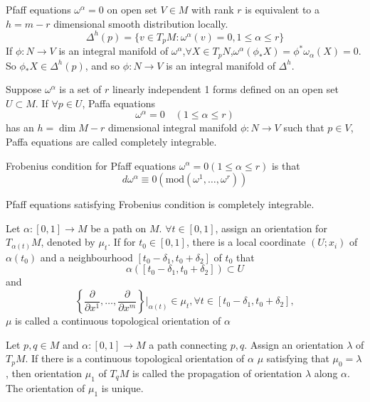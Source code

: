 \begin{newprop}
Pfaff equations $\omega^{\alpha} = 0$ on open set $V \in M$ with rank $r$ is equivalent to a $h=m-r$ dimensional smooth distribution locally.
\[\Delta^h(p) = \{v \in T_pM:\omega^{\alpha}(v)=0,1 \le \alpha \le r \}\]
If $\phi:N \to V$ is an integral manifold of $\omega^{\alpha}$,$\forall X \in T_pN$,$\omega^{\alpha}(\phi_{*}X) = \phi^* \omega_{\alpha}(X) =0$. So $\phi_* X \in \Delta^h(p)$, and so $\phi:N \to V$ is an integral manifold of $\Delta^h$.
\end{newprop}

\begin{newdef}
Suppose $\omega^{\alpha}$ is a set of $r$ linearly independent 1 forms defined on an open set $U \subset M$. If $\forall p \in U$,  Paffa equations
\[\omega^{\alpha} = 0 \quad (1 \leq \alpha \leq r)\]
has an $h = \dim M -r$ dimensional integral manifold $\phi: N \to V$ such that $p \in V$, Paffa equations are called completely integrable.
\end{newdef}     

\begin{newdef}
Frobenius condition for Pfaff equations $\omega^{\alpha} =0(1 \le \alpha \le r)$ is that
\[d\omega^{\alpha} \equiv 0(\mathrm{mod}(\omega^1,\ldots,\omega^r))\]
\end{newdef}

\begin{newthem}
Pfaff equations satisfying Frobenius condition is completely integrable.
\end{newthem}

\begin{newdef}
Let $\alpha:[0,1] \to M$ be a path on $M$. $\forall t \in [0,1]$, assign an orientation for $T_{\alpha(t)}M$, denoted by $\mu_t$. If for $t_0 \in [0,1]$, there is a local coordinate $(U;x_i)$ of $\alpha(t_0)$ and a neighbourhood $[t_0-\delta_1,t_0+\delta_2]$ of $t_0$ that
\[\alpha([t_0-\delta_1,t_0+\delta_2]) \subset U\] 
and
\[\left\{ \frac{\partial}{\partial x^1},\ldots,\frac{\partial}{\partial x^m}\right\}|_{\alpha(t)} \in \mu_t,\forall t \in [t_0-\delta_1,t_0+\delta_2],\] 
$\mu$ is called a continuous topological orientation of $\alpha$
\end{newdef}

\begin{newdef}
Let $p,q \in M$ and $\alpha:[0,1] \to M$ a path connecting $p,q$. Assign an orientation $\lambda$ of $T_pM$. If there is a continuous topological orientation of $\alpha$ $\mu$ satisfying that $\mu_0 = \lambda$, then orientation $\mu_1$ of $T_qM$ is called the propagation of orientation $\lambda$ along $\alpha$. The orientation of $\mu_1$ is unique.
\end{newdef}

